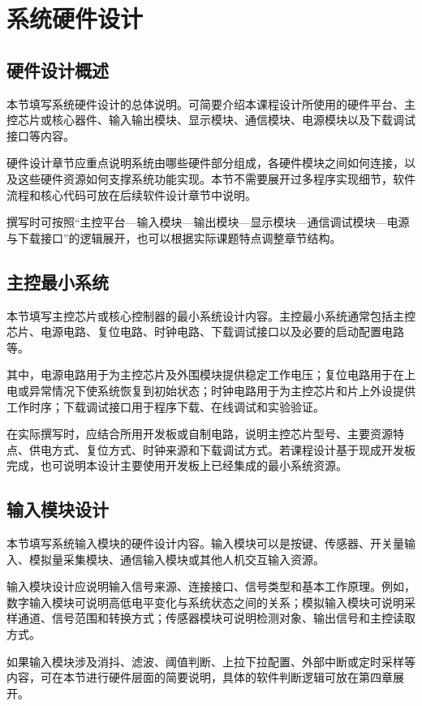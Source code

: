 \chapter{系统硬件设计}

\section{硬件设计概述}

本节填写系统硬件设计的总体说明。可简要介绍本课程设计所使用的硬件平台、主控芯片或核心器件、输入输出模块、显示模块、通信模块、电源模块以及下载调试接口等内容。

硬件设计章节应重点说明系统由哪些硬件部分组成，各硬件模块之间如何连接，以及这些硬件资源如何支撑系统功能实现。本节不需要展开过多程序实现细节，软件流程和核心代码可放在后续软件设计章节中说明。

撰写时可按照“主控平台—输入模块—输出模块—显示模块—通信调试模块—电源与下载接口”的逻辑展开，也可以根据实际课题特点调整章节结构。

\section{主控最小系统}

本节填写主控芯片或核心控制器的最小系统设计内容。主控最小系统通常包括主控芯片、电源电路、复位电路、时钟电路、下载调试接口以及必要的启动配置电路等。

其中，电源电路用于为主控芯片及外围模块提供稳定工作电压；复位电路用于在上电或异常情况下使系统恢复到初始状态；时钟电路用于为主控芯片和片上外设提供工作时序；下载调试接口用于程序下载、在线调试和实验验证。

在实际撰写时，应结合所用开发板或自制电路，说明主控芯片型号、主要资源特点、供电方式、复位方式、时钟来源和下载调试方式。若课程设计基于现成开发板完成，也可说明本设计主要使用开发板上已经集成的最小系统资源。

\section{输入模块设计}

本节填写系统输入模块的硬件设计内容。输入模块可以是按键、传感器、开关量输入、模拟量采集模块、通信输入模块或其他人机交互输入资源。

输入模块设计应说明输入信号来源、连接接口、信号类型和基本工作原理。例如，数字输入模块可说明高低电平变化与系统状态之间的关系；模拟输入模块可说明采样通道、信号范围和转换方式；传感器模块可说明检测对象、输出信号和主控读取方式。

如果输入模块涉及消抖、滤波、阈值判断、上拉下拉配置、外部中断或定时采样等内容，可在本节进行硬件层面的简要说明，具体的软件判断逻辑可放在第四章展开。

